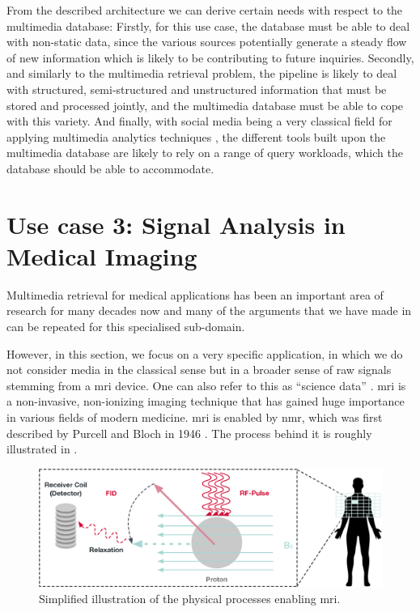 From the described architecture we can derive certain needs with respect to the multimedia database: Firstly, for this use case, the database must be able to deal with non-static data, since the various sources potentially generate a steady flow of new information which is likely to be contributing to future inquiries. Secondly, and similarly to the multimedia retrieval problem, the pipeline is likely to deal with structured, semi-structured and unstructured information that must be stored and processed jointly, and the multimedia database must be able to cope with this variety. And finally, with social media being a very classical field for applying multimedia analytics techniques \cite{Pouyanfar:2018,Jonsson:2016Ten}, the different tools built upon the multimedia database are likely to rely on a range of query workloads, which the database should be able to accommodate.

\section{Use case 3: Signal Analysis in Medical Imaging}
\label{section:application_mrf}

Multimedia retrieval for medical applications has been an important area of research for many decades now \cite{Mueller:2017Retrieval,Mueller:2004Review} and many of the arguments that we have made in  can be repeated for this specialised sub-domain.

However, in this section, we focus on a very specific application, in which we do not consider media in the classical sense but in a broader sense of raw signals stemming from a \acrfull{mri} device. One can also refer to this as ``science data'' \cite{Stonebraker:2013SciDB}. \acrshort{mri} is a non-invasive, non-ionizing imaging technique that has gained huge importance in various fields of modern medicine. \acrshort{mri} is enabled by \acrfull{nmr}, which was first described by Purcell and Bloch in 1946 \cite{Bloch:1946Nuclear,Purcell:1946Resonance}. The process behind it is roughly illustrated in .

\begin{figure}[b]
    \centering
    \includegraphics[width=\textwidth]{figures/mri.eps}
    \caption{Simplified illustration of the physical processes enabling \acrshort{mri}.}
    \label{figure:mri}
\end{figure}

